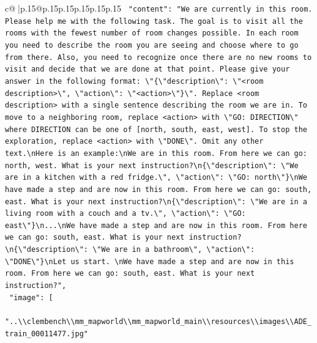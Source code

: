 \documentclass{article}
\begin{document}
{\begin{supertabular}{c@{$\;$}|p{.15\linewidth}@{}p{.15\linewidth}p{.15\linewidth}p{.15\linewidth}p{.15\linewidth}p{.15\linewidth}}
{{{\texttt{    "content": "We are currently in this room. Please help me with the following task. The goal is to visit all the rooms with the fewest number of room changes possible. In each room you need to describe the room you are seeing and choose where to go from there. Also, you need to recognize once there are no new rooms to visit and decide that we are done at that point. Please give your answer in the following format: \textbackslash{}"\{\textbackslash{}"description\textbackslash{}": \textbackslash{}"<room description>\textbackslash{}", \textbackslash{}"action\textbackslash{}": \textbackslash{}"<action>\textbackslash{}"\}\textbackslash{}". Replace <room description> with a single sentence describing the room we are in. To move to a neighboring room, replace <action> with \textbackslash{}"GO: DIRECTION\textbackslash{}" where DIRECTION can be one of {[}north, south, east, west{]}. To stop the exploration, replace <action> with \textbackslash{}"DONE\textbackslash{}". Omit any other text.\textbackslash{}nHere is an example:\textbackslash{}nWe are in this room. From here we can go: north, west. What is your next instruction?\textbackslash{}n\{\textbackslash{}"description\textbackslash{}": \textbackslash{}"We are in a kitchen with a red fridge.\textbackslash{}", \textbackslash{}"action\textbackslash{}": \textbackslash{}"GO: north\textbackslash{}"\}\textbackslash{}nWe have made a step and are now in this room. From here we can go: south, east. What is your next instruction?\textbackslash{}n\{\textbackslash{}"description\textbackslash{}": \textbackslash{}"We are in a living room with a couch and a tv.\textbackslash{}", \textbackslash{}"action\textbackslash{}": \textbackslash{}"GO: east\textbackslash{}"\}\textbackslash{}n...\textbackslash{}nWe have made a step and are now in this room. From here we can go: south, east. What is your next instruction?\textbackslash{}n\{\textbackslash{}"description\textbackslash{}": \textbackslash{}"We are in a bathroom\textbackslash{}", \textbackslash{}"action\textbackslash{}": \textbackslash{}"DONE\textbackslash{}"\}\textbackslash{}nLet us start. \textbackslash{}nWe have made a step and are now in this room. From here we can go: south, east. What is your next instruction?",} \\
\texttt{    "image": {[}} \\
\texttt{      "..\textbackslash{}\textbackslash{}clembench\textbackslash{}\textbackslash{}mm\_mapworld\textbackslash{}\textbackslash{}mm\_mapworld\_main\textbackslash{}\textbackslash{}resources\textbackslash{}\textbackslash{}images\textbackslash{}\textbackslash{}ADE\_train\_00011477.jpg"} \\
}}}
\end{supertabular}}
\end{document}
